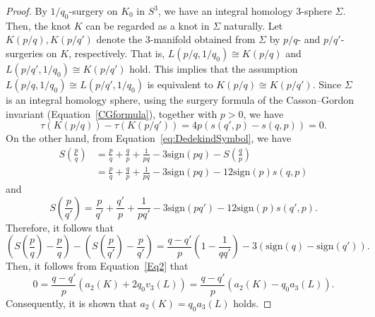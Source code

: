 \documentclass[10pt,a4paper]{amsart}
\begin{document}
\begin{proof}
By $1/q_0$-surgery on $K_0$ in $S^3$, we have an integral homology 3-sphere $\Sigma$. 
Then, the knot $K$ can be regarded as a knot in $\Sigma$ naturally. 
Let $K(p/q), K(p/q')$ denote the 3-manifold obtained from $\Sigma$ by $p/q$- and $p/q'$-surgeries on $K$, respectively. 
That is, $L(p/q,1/q_0) \cong K(p/q)$ and $L(p/q', 1/q_0) \cong K(p/q')$ hold. 
This implies that the assumption $L(p/q,1/q_0) \cong L(p/q', 1/q_0)$ is equivalent to $K(p/q) \cong K(p/q')$. 
Since $\Sigma$ is an integral homology sphere, using the surgery formula of the Casson--Gordon invariant (Equation~\eqref{CGformula}), together with $p>0$, we have 
\[
\tau (K(p/q)) - \tau (K(p/q')) = 4p\left( s(q',p) - s(q,p) \right)= 0. 
\]
On the other hand, from Equation~\eqref{eq:DedekindSymbol}, we have 
\begin{align*}
S\left(\frac{p}{q}\right) 
&= \frac{p}{q} + \frac{q}{p} + \frac{1}{pq} - 3 \mathrm{sign}(pq) - S \left( \frac{q}{p} \right) \\
&= 
\frac{p}{q} + \frac{q}{p} + \frac{1}{pq} - 3 \mathrm{sign}(pq) - 
12 \mathrm{sign}(p) s(q,p) 
\end{align*} 
and 
\[
S\left(\frac{p}{q'}\right) 
= 
\frac{p}{q'} + \frac{q'}{p} + \frac{1}{pq'} - 3 \mathrm{sign}(pq') - 
12 \mathrm{sign}(p) s(q',p).
\]
Therefore, 
it follows that 
\[
\left( S\left( \frac{p}{q} \right) - \frac{p}{q} \right)
- \left( S\left( \frac{p}{q'} \right) - \frac{p}{q'} \right) = 
\frac{q-q'}{p}\left( 1 - \frac{1}{qq'} \right) - 3 \left( \mathrm{sign}(q) - \mathrm{sign}(q') \right).
\]
Then, it follows from Equation~\eqref{Eq2} that 
\[
0
 = \frac{ q - q' }{ p } \left( a_2 (K) + 2 q_0 v_3(L) \right) 
 = \frac{ q - q' }{ p } \left( a_2 (K) - q_0 a_3(L) \right).
 \]
Consequently, it is shown that $a_2 (K) = q_0 a_3(L)$ holds. 
\end{proof}
\end{document}
